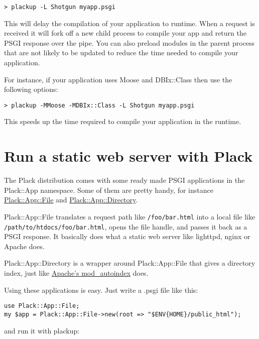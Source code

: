 \begin{lstlisting}
> plackup -L Shotgun myapp.psgi
\end{lstlisting}

This will delay the compilation of your application to runtime. When a
request is received it will fork off a new child process to compile your
app and return the PSGI response over the pipe. You can also preload
modules in the parent process that are not likely to be updated to
reduce the time needed to compile your application.

For instance, if your application uses Moose and DBIx::Class then use
the following options:

\begin{lstlisting}
> plackup -MMoose -MDBIx::Class -L Shotgun myapp.psgi
\end{lstlisting}

This speeds up the time required to compile your application in the
runtime.

\chapter{Run a static web server with
Plack}\label{day-5-run-a-static-web-server-with-plack}

The Plack distribution comes with some ready made PSGI applications in
the Plack::App namespace. Some of them are pretty handy, for instance
\href{http://search.cpan.org/perldoc?Plack::App::File}{Plack::App::File}
and
\href{http://search.cpan.org/perldoc?Plack::App::Directory}{Plack::App::Directory}.

Plack::App::File translates a request path like
\lstinline!/foo/bar.html! into a local file like
\lstinline!/path/to/htdocs/foo/bar.html!, opens the file handle, and
passes it back as a PSGI response. It basically does what a static web
server like lighttpd, nginx or Apache does.

Plack::App::Directory is a wrapper around Plack::App::File that gives a
directory index, just like
\href{http://httpd.apache.org/docs/2.0/mod/mod_autoindex.html}{Apache's
mod\_autoindex} does.

Using these applications is easy. Just write a .psgi file like this:

\begin{lstlisting}
use Plack::App::File;
my $app = Plack::App::File->new(root => "$ENV{HOME}/public_html");
\end{lstlisting}

and run it with plackup:

